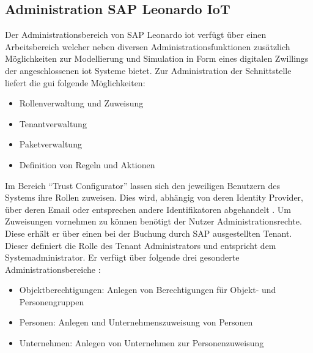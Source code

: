 \subsection{Administration SAP Leonardo IoT}
\label{ss:interface:admin}

\noindent Der Administrationsbereich von SAP Leonardo \ac{iot} verfügt über einen Arbeitsbereich welcher neben diversen Administrationsfunktionen zusätzlich Möglichkeiten zur Modellierung und Simulation in Form eines digitalen Zwillings der angeschlossenen \ac{iot} Systeme bietet. Zur Administration der Schnittstelle liefert die \ac{gui} folgende Möglichkeiten:
\begin{itemize}
	\item{Rollenverwaltung und Zuweisung}
	\item{Tenantverwaltung}
	\item{Paketverwaltung}
	\item{Definition von Regeln und Aktionen}
\end{itemize}

\noindent Im Bereich "`Trust Configurator"' lassen sich den jeweiligen Benutzern des Systems ihre Rollen zuweisen. Dies wird, abhängig von deren Identity Provider, über deren Email oder entsprechen andere Identifikatoren abgehandelt \cite[Seite 209f]{Holtschulte20:IOS}. Um Zuweisungen vornehmen zu können benötigt der Nutzer Administrationsrechte. Diese erhält er über einen bei der Buchung durch SAP ausgestellten Tenant. Dieser definiert die Rolle des Tenant Administrators und entspricht dem Systemadministrator. Er verfügt über folgende drei gesonderte Administrationsbereiche \cite[Seiten 220 - 221, 223]{Holtschulte20:IOS}:
\begin{itemize}
	\item{Objektberechtigungen: Anlegen von Berechtigungen für Objekt- und Personengruppen}
	\item{Personen: Anlegen und Unternehmenszuweisung von Personen}
	\item{Unternehmen: Anlegen von Unternehmen zur Personenzuweisung}
\end{itemize}

